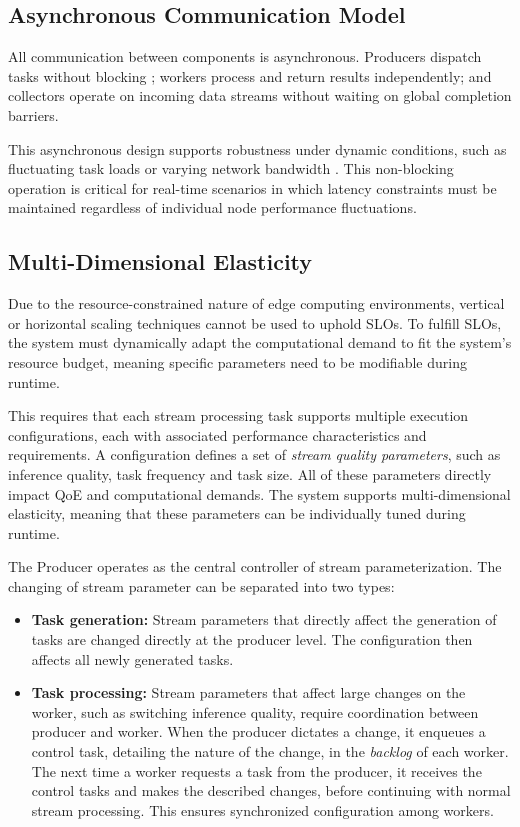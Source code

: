 \subsection{Asynchronous Communication Model}
All communication between components is asynchronous. Producers dispatch tasks without blocking \cite{lauener_how_2018}; workers process and return results independently; and collectors operate on incoming data streams without waiting on global completion barriers.

This asynchronous design supports robustness under dynamic conditions, such as fluctuating task loads or varying network bandwidth \cite{nguyen_octopinf_2025}. This non-blocking operation is critical for real-time scenarios in which latency constraints must be maintained regardless of individual node performance fluctuations.


\subsection{Multi-Dimensional Elasticity}
Due to the resource-constrained nature of edge computing environments, vertical or horizontal scaling techniques cannot be used to uphold SLOs. To fulfill SLOs, the system must dynamically adapt the computational demand to fit the system's resource budget, meaning specific parameters need to be modifiable during runtime.

This requires that each stream processing task supports multiple execution configurations, each with associated performance characteristics and requirements. A configuration defines a set of \textit{stream quality parameters}, such as inference quality, task frequency and task size. All of these parameters directly impact QoE and computational demands. The system supports multi-dimensional elasticity, meaning that these parameters can be individually tuned during runtime.

The Producer operates as the central controller of stream parameterization. The changing of stream parameter can be separated into two types:

\begin{itemize}
    \item \textbf{Task generation:} Stream parameters that directly affect the generation of tasks are changed directly at the producer level. The configuration then affects all newly generated tasks.
    \item \textbf{Task processing:} Stream parameters that affect large changes on the worker, such as switching inference quality, require coordination between producer and worker. When the producer dictates a change, it enqueues a control task, detailing the nature of the change, in the \textit{backlog}\label{def:backlog} of each worker. The next time a worker requests a task from the producer, it receives the control tasks and makes the described changes, before continuing with normal stream processing. This ensures synchronized configuration among workers.
\end{itemize}

